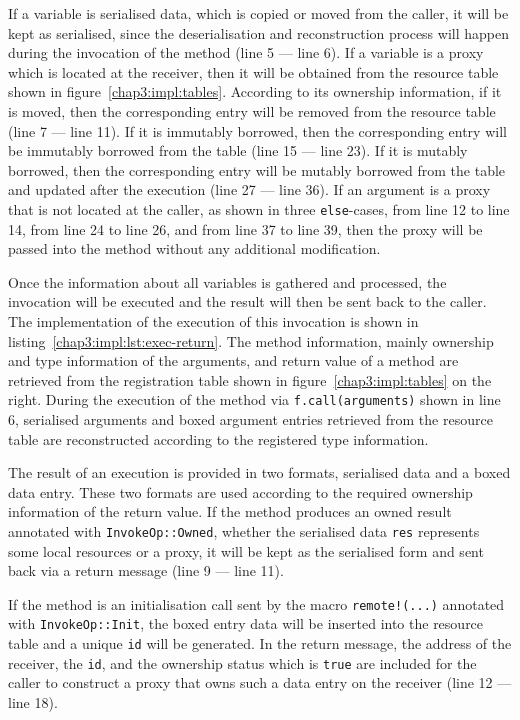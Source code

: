 If a variable is serialised data, which is copied or moved from the caller, it will be kept as serialised, since the deserialisation and reconstruction process will happen during the invocation of the method (line 5 --- line 6).
If a variable is a proxy which is located at the receiver, then it will be obtained from the resource table shown in figure~\ref{chap3:impl:tables}. According to its ownership information, if it is moved, then the corresponding entry will be removed from the resource table (line 7 --- line 11). 
If it is immutably borrowed, then the corresponding entry will be immutably borrowed from the table (line 15 --- line 23). If it is mutably borrowed, then the corresponding entry will be mutably borrowed from the table and updated after the execution (line 27 --- line 36). 
If an argument is a proxy that is not located at the caller, as shown in three \texttt{else}-cases, from line 12 to line 14, from line 24 to line 26, and from line 37 to line 39, then the proxy will be passed into the method without any additional modification.

Once the information about all variables is gathered and processed, the invocation will be executed and the result will then be sent back to the caller. The implementation of the execution of this invocation is shown in listing~\ref{chap3:impl:lst:exec-return}. The method information, mainly ownership and type information of the arguments, and return value of a method are retrieved from the registration table shown in figure~\ref{chap3:impl:tables} on the right. During the execution of the method via \texttt{f.call(arguments)} shown in line 6, serialised arguments and boxed argument entries retrieved from the resource table are reconstructed according to the registered type information.

The result of an execution is provided in two formats, serialised data and a boxed data entry. These two formats are used according to the required ownership information of the return value. 
If the method produces an owned result annotated with \texttt{InvokeOp::Owned}, whether the serialised data \texttt{res} represents some local resources or a proxy, it will be kept as the serialised form and sent back via a return message (line 9 --- line 11). 

If the method is an initialisation call sent by the macro \texttt{remote!(...)} annotated with \texttt{InvokeOp::Init}, the boxed entry data will be inserted into the resource table and a unique \texttt{id} will be generated. In the return message, the address of the receiver, the \texttt{id}, and the ownership status which is \texttt{true} are included for the caller to construct a proxy that owns such a data entry on the receiver (line 12 --- line 18).

